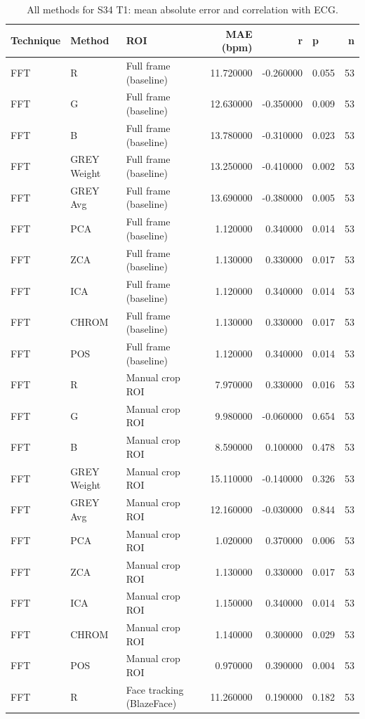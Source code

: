 \begin{table}[htbp]
\centering
\caption{All methods for S34 T1: mean absolute error and correlation with ECG.}
\label{tab:spread_s34_t1}
\begin{tabular}{l l l r r l r}
\toprule
Technique & Method & ROI & MAE (bpm) & r & p & n \\
\midrule
FFT & R & Full frame (baseline) & 11.720000 & -0.260000 & 0.055 & 53 \\
FFT & G & Full frame (baseline) & 12.630000 & -0.350000 & 0.009 & 53 \\
FFT & B & Full frame (baseline) & 13.780000 & -0.310000 & 0.023 & 53 \\
FFT & GREY Weight & Full frame (baseline) & 13.250000 & -0.410000 & 0.002 & 53 \\
FFT & GREY Avg & Full frame (baseline) & 13.690000 & -0.380000 & 0.005 & 53 \\
FFT & PCA & Full frame (baseline) & 1.120000 & 0.340000 & 0.014 & 53 \\
FFT & ZCA & Full frame (baseline) & 1.130000 & 0.330000 & 0.017 & 53 \\
FFT & ICA & Full frame (baseline) & 1.120000 & 0.340000 & 0.014 & 53 \\
FFT & CHROM & Full frame (baseline) & 1.130000 & 0.330000 & 0.017 & 53 \\
FFT & POS & Full frame (baseline) & 1.120000 & 0.340000 & 0.014 & 53 \\
FFT & R & Manual crop ROI & 7.970000 & 0.330000 & 0.016 & 53 \\
FFT & G & Manual crop ROI & 9.980000 & -0.060000 & 0.654 & 53 \\
FFT & B & Manual crop ROI & 8.590000 & 0.100000 & 0.478 & 53 \\
FFT & GREY Weight & Manual crop ROI & 15.110000 & -0.140000 & 0.326 & 53 \\
FFT & GREY Avg & Manual crop ROI & 12.160000 & -0.030000 & 0.844 & 53 \\
FFT & PCA & Manual crop ROI & 1.020000 & 0.370000 & 0.006 & 53 \\
FFT & ZCA & Manual crop ROI & 1.130000 & 0.330000 & 0.017 & 53 \\
FFT & ICA & Manual crop ROI & 1.150000 & 0.340000 & 0.014 & 53 \\
FFT & CHROM & Manual crop ROI & 1.140000 & 0.300000 & 0.029 & 53 \\
FFT & POS & Manual crop ROI & 0.970000 & 0.390000 & 0.004 & 53 \\
FFT & R & Face tracking (BlazeFace) & 11.260000 & 0.190000 & 0.182 & 53 \\

\end{tabular}
\end{table}
